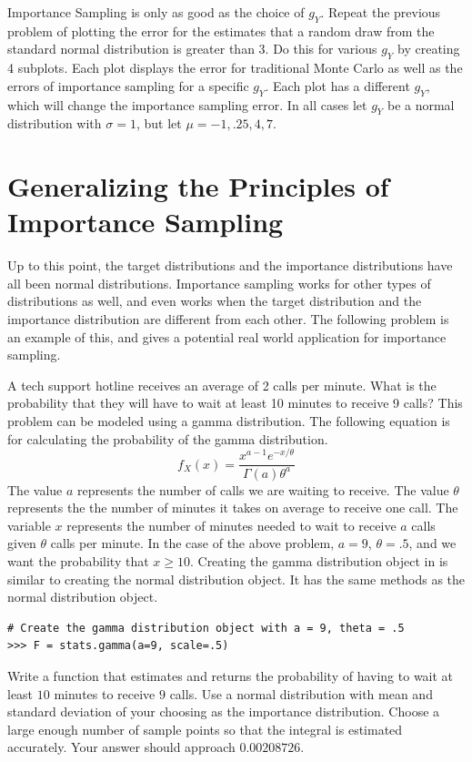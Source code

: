 \begin{problem} \label{prob:other_plots}
Importance Sampling is only as good as the choice of $g_Y$.
Repeat the previous problem of plotting the error for the estimates that a random draw from the standard normal distribution is greater than 3.
Do this for various $g_Y$ by creating 4 subplots.
Each plot displays the error for traditional Monte Carlo as well as the errors of importance sampling for a specific $g_Y$.
Each plot has a different $g_Y$, which will change the importance sampling error.
In all cases let $g_Y$ be a normal distribution with $\sigma =1$, but let $\mu = -1, .25, 4, 7$.
\end{problem}

\section*{Generalizing the Principles of Importance Sampling} %

Up to this point, the target distributions and the importance distributions have all been normal distributions.
Importance sampling works for other types of distributions as well, and even works when the target distribution and the importance distribution are different from each other.
The following problem is an example of this, and gives a potential real world application for importance sampling.

\begin{problem} \label{prob:gamma}
A tech support hotline receives an average of 2 calls per minute.
What is the probability that they will have to wait at least 10 minutes to receive 9 calls?
This problem can be modeled using a gamma distribution.
The following equation is for calculating the probability of the gamma distribution.
$$f_X(x) = \frac{x^{a-1}e^{-x/\theta}}{\Gamma(a)\theta^a}$$
The value $a$ represents the number of calls we are waiting to receive.
The value $\theta$ represents the the number of minutes it takes on average to receive one call.
The variable $x$ represents the number of minutes needed to wait to receive $a$ calls given $\theta$ calls per minute.
In the case of the above problem, $a = 9$, $\theta = .5$, and we want the probability that $x \geq 10$.
Creating the gamma distribution object in  is similar to creating the normal distribution object.
It has the same methods as the normal distribution object.

\begin{lstlisting}
# Create the gamma distribution object with a = 9, theta = .5
>>> F = stats.gamma(a=9, scale=.5)
\end{lstlisting}

Write a function that estimates and returns the probability of having to wait at least $10$ minutes to receive $9$ calls.
Use a normal distribution with mean and standard deviation of your choosing as the importance distribution.
Choose a large enough number of sample points so that the integral is estimated accurately.
Your answer should approach $0.00208726$.
\end{problem}

